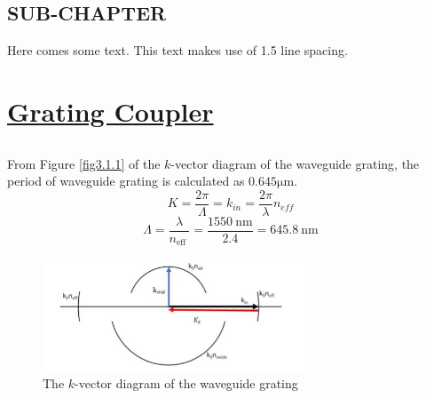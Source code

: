 \documentclass[fontsize=11pt]{scrartcl}
\begin{document}
\subsection{SUB-CHAPTER}
Here comes some text. This text makes use of 1.5 line spacing. 
\pagebreak
\section{\uline{Grating Coupler}}
\subsection{}
From Figure \ref{fig3.1.1} of the $k$-vector diagram of the waveguide grating, 
the period of waveguide grating is calculated as $0.645\mathrm{\mu m}$.
\begin{equation}
    K=\frac{2 \pi}{\Lambda}=k_{i n}=\frac{2 \pi}{\lambda} n_{e f f}
\end{equation}
\begin{equation}
    \Lambda=\frac{\lambda}{n_{\text {eff }}}=\frac{1550 \mathrm{~nm}}{2.4}=645.8 \mathrm{~nm}
\end{equation}  
\begin{figure}[H]
    \centering
     \includegraphics[width=0.7\textwidth]{img/fig3.1.jpg}
     \caption{The $k$-vector diagram of the waveguide grating}
     \label{fig3.1}
\end{figure}
\end{document}
